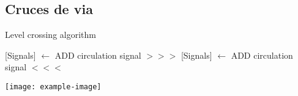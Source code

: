 \subsection{Cruces de via}

\lipsum[1-2]

    \begin{algorithm}[hbt!]
        \caption{Level crossing algorithm}\label{alg:LC}
        \DontPrintSemicolon
        \SetNoFillComment
        \LinesNotNumbered 
        {
            [Signals] $\gets$ ADD circulation signal $>>>$\;
            [Signals] $\gets$ ADD circulation signal $<<<$\;
        }
        \KwResult{[Signals]} 
    \end{algorithm}

\lipsum[1]
\texttt{[image: example-image]}\\
\lipsum[1-2]